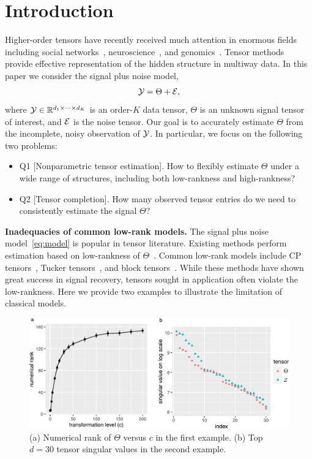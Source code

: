 \documentclass{article}
\theoremstyle{plain}
\theoremstyle{definition}
\begin{document}
\section{Introduction}\label{sec:intro}

Higher-order tensors have recently received much attention in enormous fields including social networks~\cite{anandkumar2014tensor}, neuroscience~\cite{wang2017bayesian}, and genomics~\cite{wang2019three}. Tensor methods provide effective representation of the hidden structure in multiway data. In this paper we consider the signal plus noise model,
\begin{equation}\label{eq:modelintro}
\mathcal{Y}=\Theta+\mathcal{E},
\end{equation}
where $\mathcal{Y}\in\mathbb{R}^{d_1\times \cdots \times d_K}$ is an order-$K$ data tensor, $\Theta$ is an unknown signal tensor of interest, and $\mathcal{E}$ is the noise tensor. Our goal is to accurately estimate $\Theta$ from the incomplete, noisy observation of $\mathcal{Y}$. In particular, we focus on the following two problems:
\begin{itemize}[leftmargin=*,topsep=0pt,itemsep=-1ex,partopsep=1ex,parsep=1ex]
\item Q1 [Nonparametric tensor estimation]. How to flexibly estimate $\Theta$ under a wide range of structures, including both low-rankness and high-rankness?
\item Q2 [Tensor completion]. How many observed tensor entries do we need to consistently estimate the signal $\Theta$?
\end{itemize}

{\bf Inadequacies of common low-rank models.} The signal plus noise model~\eqref{eq:model} is popular in tensor literature. Existing methods perform estimation based on low-rankness of $\Theta$~\cite{montanari2018spectral,cai2019nonconvex}. Common low-rank models include CP tensors~\cite{anandkumar2014tensor}, Tucker tensors~\cite{de2000multilinear}, and block tensors~\cite{wang2019multiway}. While these methods have shown great success in signal recovery, tensors sought in application often violate the low-rankness. Here we provide two examples to illustrate the limitation of classical models.

\begin{figure}[h]
\vspace{-.2cm}
\includegraphics[width=.47\textwidth]{figure/example_comb.pdf}
\caption{(a) Numerical rank of $\Theta$ versus $c$ in the first example. (b) Top $d=30$ tensor singular values in the second example. }\label{fig:example}
\vspace{-.3cm}
\end{figure}
\end{document}
